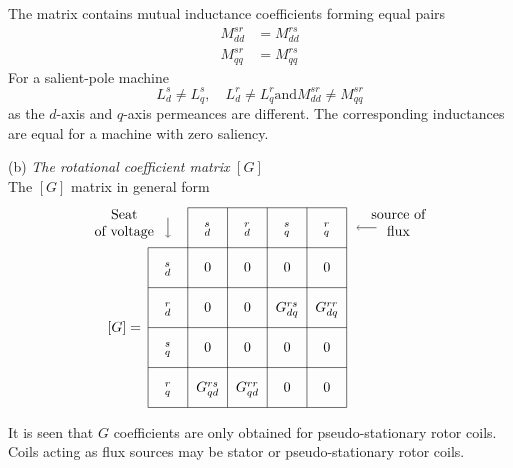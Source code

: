 \documentclass[a4paper,numbers=noenddot,12pt]{scrbook}
\begin{document}
        The matrix contains mutual inductance coefficients forming equal pairs
        \begin{align*}
            M_{dd}^{sr} & = M_{dd}^{rs} \\
            M_{qq}^{sr} & = M_{qq}^{rs}
        \end{align*}
        For a salient-pole machine
        \begin{equation*}
            L_d^s \neq L_q^s , \quad L_d^r \neq L_q^r \text{and} M_{dd}^{sr} \neq M_{qq}^{sr}
        \end{equation*}
        as the $d$-axis and $q$-axis permeances are different. The corresponding inductances are equal for a machine with zero saliency.

        \vspace{2em}

        \noindent (b) \emph{The rotational coefficient matrix} $[G]$\\
        The $[G]$ matrix in general form
        \begin{equation}
            \begin{tikzpicture} [anchor = base, baseline =0pt]
                \draw (0,0)--(5,0) (0,1)--(5,1) (0,2)--(5,2) (1,3)--(5,3) (0,-1)--(5,-1) (0,-2)--(5,-2);
                \draw (0,-2)--(0,2) (1,-2)--(1,3) (2,-2)--(2,3) (3,-2)--(3,3) (4,-2)--(4,3) (5,-2)--(5,3);
                \draw (0.5,-1.6) node{$_q^r$} +(0,1) node{$_q^s$} +(0,2) node{$_d^r$} +(0,3) node{$_d^s$};
                \draw (1.5,-1.6) node{$G_{qd}^{rs}$} +(0,1) node{0} +(0,2) node{0} +(0,3) node{0}+(0,4) node{$_d^s$};
                \draw (2.5,-1.6) node{$G_{qd}^{rr}$} +(0,1) node{0} +(0,2) node{0} +(0,3) node{0}+(0,4) node{$_d^r$};
                \draw (3.5,-1.6) node{0} +(0,1) node{0} +(0,2) node{$G_{dq}^{rs}$} +(0,3) node{0}+(0,4) node{$_q^s$};
                \draw (4.5,-1.6) node{0} +(0,1) node{0} +(0,2) node{$G_{dq}^{rr}$} +(0,3) node{0}+(0,4) node{$_q^r$};
                \draw (-0.6,-0.1) node{$[G] =$};
                \draw [align = center,->](-0.6, 2.3) node{Seat\\of voltage} (0.5,2.75)--(0.5, 2.25);
                \draw [align = center,->](6.3, 2.3) node{source of\\flux} (5.75,2.5)--(5.25,2.5);
            \end{tikzpicture}
        \end{equation}

        It is seen that $G$ coefficients are only obtained for pseudo-stationary rotor coils. Coils acting as flux sources may be stator or pseudo-stationary rotor coils.
\end{document}
